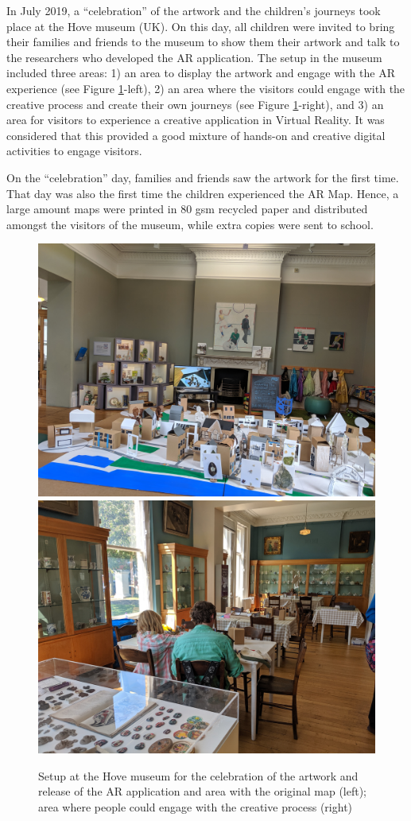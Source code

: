 \documentclass[acmlarge,screen,dvipsnames]{acmart}
\begin{document}
In July 2019, a ``celebration'' of the artwork and the children's journeys took
place at the Hove museum (UK). On this day, all children were invited to
bring their families and friends to the museum to show them their artwork and talk to the
researchers who developed the AR application. The setup in the museum included
three areas: 1) an area to display the artwork and engage with the AR
experience (see Figure \ref{fig:museum}-left), 2) an area where the visitors could engage with the creative process and create their own journeys (see Figure
\ref{fig:museum}-right), and 3) an area for visitors to experience a creative
application in Virtual Reality. It was considered that this provided a good mixture
of hands-on and creative digital activities to engage visitors.

On the ``celebration'' day, families and friends saw the artwork for the first time. That day was also the first time the children experienced the AR Map. Hence, a
large amount maps were printed in 80 gsm recycled paper and distributed amongst the
visitors of the museum, while extra copies were sent to school.

\begin{figure}[ht] \centering
\includegraphics[width=0.48\linewidth]{images/IMG_20190720_103105.jpg}
\includegraphics[width=0.48\linewidth]{images/IMG_20190720_151644.jpg}
\caption{Setup at the Hove museum for the celebration of the artwork and
release of the AR application and area with the original map (left); area
where people could engage with the creative process (right)} \label{fig:museum}
\end{figure}
 
\end{document}
